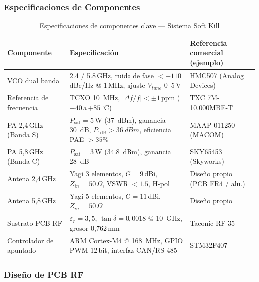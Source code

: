 \documentclass[12pt,a4paper]{article}
\begin{document}
\subsubsection{Especificaciones de Componentes}

\begin{table}[H]
\centering
\caption{Especificaciones de componentes clave — Sistema Soft Kill}
\label{tab:comp_sk}
\renewcommand{\arraystretch}{1.25}
\begin{tabularx}{\textwidth}{lXX}
\toprule
\textbf{Componente} & \textbf{Especificación} & \textbf{Referencia comercial (ejemplo)} \\
\midrule
VCO dual banda &
  2.4 / 5.8\,GHz, ruido de fase $< -110$\,dBc/Hz @ 1\,MHz,
  ajuste $V_{tune}$ 0–5\,V &
  HMC507 (Analog Devices) \\[2pt]

Referencia de frecuencia &
  TCXO \SI{10}{MHz}, $|\Delta f/f| < \pm 1$\,ppm ($-40$\,a\,$+85\,^{\circ}$C) &
  TXC 7M-10.000MBE-T \\[2pt]

PA 2,4\,GHz (Banda S) &
  $P_\mathrm{sat} = 5$\,W (\SI{37}{dBm}), ganancia \SI{30}{dB},
  $P_{1\mathrm{dB}} > \SI{36}{dBm}$, eficiencia PAE $> 35\%$ &
  MAAP-011250 (MACOM) \\[2pt]

PA 5,8\,GHz (Banda C) &
  $P_\mathrm{sat} = 3$\,W (\SI{34.8}{dBm}), ganancia \SI{28}{dB} &
  SKY65453 (Skyworks) \\[2pt]

Antena 2,4\,GHz &
  Yagi 3 elementos, $G = 9$\,dBi, $Z_{in} = 50\,\Omega$,
  VSWR $< 1.5$, H-pol &
  Diseño propio (PCB FR4 / alu.) \\[2pt]

Antena 5,8\,GHz &
  Yagi 5 elementos, $G = 11$\,dBi, $Z_{in} = 50\,\Omega$ &
  Diseño propio \\[2pt]

Sustrato PCB RF &
  $\varepsilon_r = 3{,}5$, $\tan\delta = 0{,}0018$ @ \SI{10}{GHz},
  grosor 0,762\,mm &
  Taconic RF-35 \\[2pt]

Controlador de apuntado &
  ARM Cortex-M4 @ \SI{168}{MHz}, GPIO PWM 12\,bit,
  interfaz CAN/RS-485 &
  STM32F407 \\
\bottomrule
\end{tabularx}
\end{table}

\subsubsection{Diseño de PCB RF}
\end{document}
